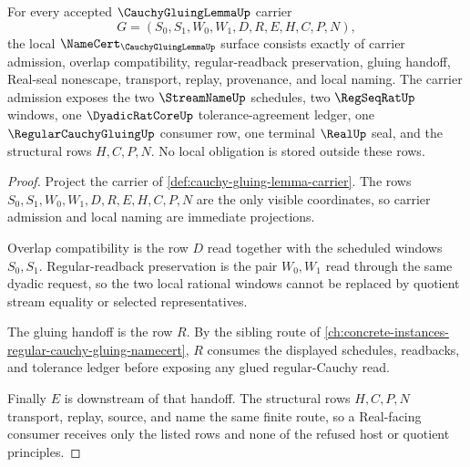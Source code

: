 \begin{theorem}
\label{thm:cauchy-gluing-lemma-namecert-obligations}
For every accepted $\CauchyGluingLemmaUp$ carrier
$$
G=(S_0,S_1,W_0,W_1,D,R,E,H,C,P,N),
$$
the local $\NameCert_{\CauchyGluingLemmaUp}$ surface consists exactly of carrier admission, overlap compatibility, regular-readback preservation, gluing handoff, Real-seal nonescape, transport, replay, provenance, and local naming. The carrier admission exposes the two $\StreamNameUp$ schedules, two $\RegSeqRatUp$ windows, one $\DyadicRatCoreUp$ tolerance-agreement ledger, one $\RegularCauchyGluingUp$ consumer row, one terminal $\RealUp$ seal, and the structural rows $H,C,P,N$. No local obligation is stored outside these rows.
\end{theorem}
\begin{proof}
Project the carrier of \autoref{def:cauchy-gluing-lemma-carrier}. The rows $S_0,S_1,W_0,W_1,D,R,E,H,C,P,N$ are the only visible coordinates, so carrier admission and local naming are immediate projections.

Overlap compatibility is the row $D$ read together with the scheduled windows $S_0,S_1$. Regular-readback preservation is the pair $W_0,W_1$ read through the same dyadic request, so the two local rational windows cannot be replaced by quotient stream equality or selected representatives.

The gluing handoff is the row $R$. By the sibling route of \autoref{ch:concrete-instances-regular-cauchy-gluing-namecert}, $R$ consumes the displayed schedules, readbacks, and tolerance ledger before exposing any glued regular-Cauchy read.

Finally $E$ is downstream of that handoff. The structural rows $H,C,P,N$ transport, replay, source, and name the same finite route, so a Real-facing consumer receives only the listed rows and none of the refused host or quotient principles.
\end{proof}

